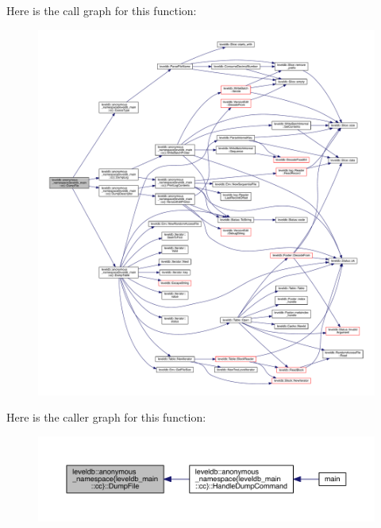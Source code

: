Here is the call graph for this function\+:
\nopagebreak
\begin{figure}[H]
\begin{center}
\leavevmode
\includegraphics[width=350pt]{namespaceleveldb_1_1anonymous__namespace_02leveldb__main_8cc_03_a502a762eb4167f987a355281002f591b_cgraph}
\end{center}
\end{figure}




Here is the caller graph for this function\+:
\nopagebreak
\begin{figure}[H]
\begin{center}
\leavevmode
\includegraphics[width=350pt]{namespaceleveldb_1_1anonymous__namespace_02leveldb__main_8cc_03_a502a762eb4167f987a355281002f591b_icgraph}
\end{center}
\end{figure}


\hypertarget{namespaceleveldb_1_1anonymous__namespace_02leveldb__main_8cc_03_aeadd7872fff20a9f13b2c81377307bb6}{}
